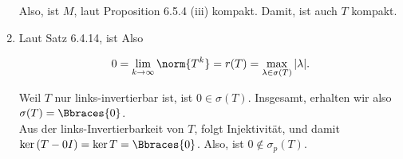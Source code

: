 \begin{solution}
\begin{enumerate}[label = (\alph*)]
  Also, ist $M$, laut Proposition 6.5.4 (iii) kompakt.
  Damit, ist auch $T$ kompakt.

  \item
  \phantom{}


  Laut Satz 6.4.14, ist Also

  \begin{align*}
    0
    =
    \lim_{k \to \infty} \norm{T^k}
    =
    r(T)
    =
    \max_{\lambda \in \sigma(T)} |\lambda|.
  \end{align*}

  Weil $T$ nur links-invertierbar ist, ist $0 \in \sigma(T)$.
  Insgesamt, erhalten wir also $\sigma(T) = \Bbraces{0}$. \\

  Aus der links-Invertierbarkeit von $T$, folgt Injektivität, und damit $\ker{(T - 0 I)} = \ker{T} = \Bbraces{0}$.
  Also, ist $0 \notin \sigma_p(T)$.

\end{enumerate}

\end{solution}
